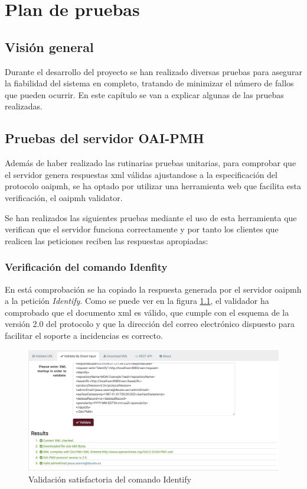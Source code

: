 \chapter{Plan de pruebas}

\section{Visión general}

Durante el desarrollo del proyecto se han realizado diversas pruebas para asegurar la fiabilidad del sistema en completo, tratando de minimizar el número de fallos que pueden ocurrir. En este capítulo se van a explicar algunas de las pruebas realizadas.

\section{Pruebas del servidor OAI-PMH}

Además de haber realizado las rutinarias pruebas unitarias, para comprobar que el servidor genera respuestas \acrshort{xml} válidas ajustandose a la especificación del protocolo \acrshort{oaipmh}, se ha optado por utilizar una herramienta web que facilita esta verificación, el \acrshort{oaipmh} validator.

Se han realizados las siguientes pruebas mediante el uso de esta herramienta que verifican que el servidor funciona correctamente y por tanto los clientes que realicen las peticiones reciben las respuestas apropiadas:

\subsection{Verificación del comando Idenfity}

En está comprobación se ha copiado la respuesta generada por el servidor \acrshort{oaipmh} a la petición \textit{Identify}. Como se puede ver en la figura \ref{fig:identify}, el validador ha comprobado que el documento \acrshort{xml} es válido, que cumple con el esquema de la versión 2.0 del protocolo y que la dirección del correo electrónico dispuesto para facilitar el soporte a incidencias es correcto.

\begin{figure}[!htbp]
	\centering
	\includegraphics[scale=0.32]{fig/oaipmh_validations/Identify}
	\caption{Validación satisfactoria del comando Identify}
	\label{fig:identify}
\end{figure}

